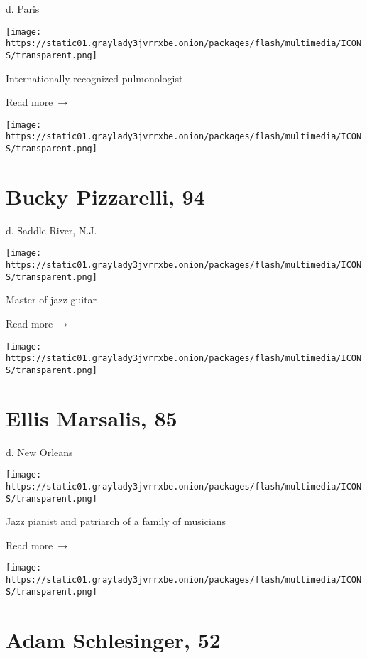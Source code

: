 d. Paris

\texttt{[image: https://static01.graylady3jvrrxbe.onion/packages/flash/multimedia/ICONS/transparent.png]}

Internationally recognized pulmonologist

 Read more~→

\href{https://www.nytimes3xbfgragh.onion/2020/04/02/arts/music/bucky-pizzarelli-dead-coronavirus.html}{}

\texttt{[image: https://static01.graylady3jvrrxbe.onion/packages/flash/multimedia/ICONS/transparent.png]}

\hypertarget{bucky-pizzarelli-94}{%
\section{Bucky Pizzarelli, 94}\label{bucky-pizzarelli-94}}

d. Saddle River, N.J.

\texttt{[image: https://static01.graylady3jvrrxbe.onion/packages/flash/multimedia/ICONS/transparent.png]}

Master of jazz guitar

 Read more~→

\href{https://www.nytimes3xbfgragh.onion/2020/04/01/arts/music/ellis-marsalis-dead-virus.html}{}

\texttt{[image: https://static01.graylady3jvrrxbe.onion/packages/flash/multimedia/ICONS/transparent.png]}

\hypertarget{ellis-marsalis-85}{%
\section{Ellis Marsalis, 85}\label{ellis-marsalis-85}}

d. New Orleans

\texttt{[image: https://static01.graylady3jvrrxbe.onion/packages/flash/multimedia/ICONS/transparent.png]}

Jazz pianist and patriarch of a family of musicians

 Read more~→

\href{https://www.nytimes3xbfgragh.onion/2020/04/01/arts/music/adam-schlesinger-dead-coronavirus.html}{}

\texttt{[image: https://static01.graylady3jvrrxbe.onion/packages/flash/multimedia/ICONS/transparent.png]}

\hypertarget{adam-schlesinger-52}{%
\section{Adam Schlesinger, 52}\label{adam-schlesinger-52}}

